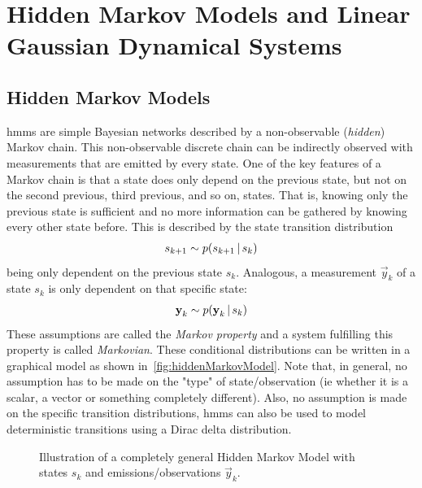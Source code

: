 	\section{Hidden Markov Models and Linear Gaussian Dynamical Systems}
		\subsection{Hidden Markov Models}
			\label{subsec:hiddenMarkovModel}

			\acp{hmm} are simple Bayesian networks described by a non-observable (\emph{hidden}) Markov chain. This non-observable discrete chain can be indirectly observed with measurements that are emitted by every state. One of the key features of a Markov chain is that a state does only depend on the previous state, but not on the second previous, third previous, and so on, states. That is, knowing only the previous state is sufficient and no more information can be gathered by knowing every other state before. This is described by the state transition distribution
			\begin{align*}
				s_{k + 1} \sim p(s_{k + 1} \,\vert\, s_k)
			\end{align*}
			being only dependent on the previous state \(s_k\). Analogous, a measurement \(\vec{y}_k\) of a state \(s_k\) is only dependent on that specific state:
			\begin{align*}
				\boldsymbol{\mathrm{y}}_k \sim p(\boldsymbol{\mathrm{y}}_k \,\vert\, s_k)
			\end{align*}
			These assumptions are called the \emph{Markov property} and a system fulfilling this property is called \emph{Markovian}. These conditional distributions can be written in a graphical model as shown in~\autoref{fig:hiddenMarkovModel}. Note that, in general, no assumption has to be made on the "type" of state/observation (\ac{ie} whether it is a scalar, a vector or something completely different). Also, no assumption is made on the specific transition distributions, \acp{hmm} can also be used to model deterministic transitions using a Dirac delta distribution.

			\begin{figure}
				\centering
				\tikzHiddenMarkovModel
				\caption{Illustration of a completely general Hidden Markov Model with states \(s_k\) and emissions/observations \(\vec{y}_k\).}
				\label{fig:hiddenMarkovModel}
			\end{figure}

